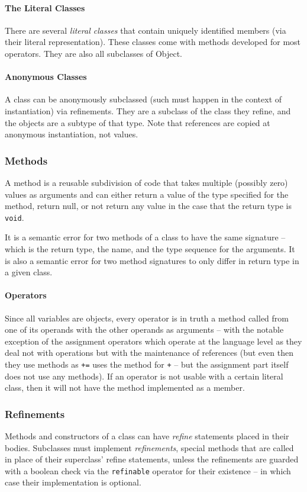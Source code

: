 \paragraph{The Literal Classes}
There are several \textit{literal classes} that contain uniquely identified members (via their literal representation). These classes come with methods developed for most operators. They are also all subclasses of Object.

\paragraph{Anonymous Classes}
A class can be anonymously subclassed (such must happen in the context of instantiation) via refinements. They are a subclass of the class they refine, and the objects are a subtype of that type. Note that references are copied at anonymous instantiation, not values.

\subsubsection{Methods}
A method is a reusable subdivision of code that takes multiple (possibly zero) values as arguments and can either return a value of the type specified for the method, return null, or not return any value in the case that the return type is \verb!void!.

It is a semantic error for two methods of a class to have the same signature -- which is the return type, the name, and the type sequence for the arguments. It is also a semantic error for two method signatures to only differ in return type in a given class.

\paragraph{Operators}
Since all variables are objects, every operator is in truth a method called from one of its operands with the other operands as arguments -- with the notable exception of the assignment operators which operate at the language level as they deal not with operations but with the maintenance of references (but even then they use methods as \verb!+=! uses the method for \verb!+! -- but the assignment part itself does not use any methods). If an operator is not usable with a certain literal class, then it will not have the method implemented as a member.

\subsubsection{Refinements}
Methods and constructors of a class can have \textit{refine} statements placed in their bodies. Subclasses must implement \textit{refinements}, special methods that are called in place of their superclass' refine statements, unless the refinements are guarded with a boolean check via the \verb!refinable! operator for their existence -- in which case their implementation is optional.

